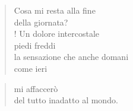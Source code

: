 
\begin{verse}
    Cosa mi resta alla fine\\
    della giornata?\\!
    Un dolore intercostale\\
    piedi freddi\\
    la sensazione che anche domani\\
    come ieri\\
\end{verse}

\begin{verse}
\end{verse}

\begin{verse}
    mi affaccerò\\
    del tutto inadatto al mondo.
\end{verse}
